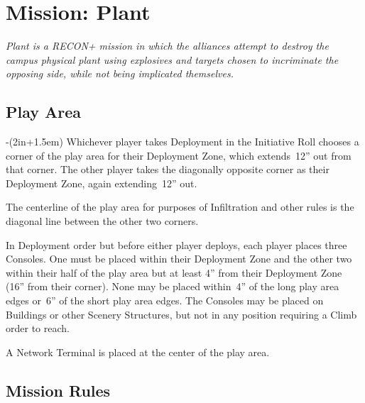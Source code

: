 \chapter{Mission: Plant}


\emph{\emph{Plant} is a RECON+ mission in which the alliances attempt
  to destroy the campus physical plant using explosives and targets
  chosen to incriminate the opposing side, while not being
  implicated themselves.}

\section{Play Area}
\vspace{-2\parskip}
\noindent\begin{stdminipage}{\linewidth-(2in+1.5em)}
\vspace{0pt}   
\noindent
Whichever player takes Deployment in the Initiative Roll chooses a
corner of the play area for their Deployment Zone, which extends~12''
out from that corner.  The other player takes the diagonally opposite
corner as their Deployment Zone, again extending~12'' out.

The centerline of the play area for purposes of Infiltration and other
rules is the diagonal line between the other two corners.

In Deployment order but before either player deploys, each player
places three Consoles.  One must be placed within their Deployment
Zone and the other two within their half of the play area but at least
4'' from their Deployment Zone (16'' from their corner).  None may be
placed within~4'' of the long play area edges or~6'' of the short play
area edges.  The Consoles may be placed on Buildings or other Scenery
Structures, but not in any position requiring a Climb order to reach.

A Network Terminal is placed at the center of the play area.

\section{Mission Rules}

\end{stdminipage}
\hfill
